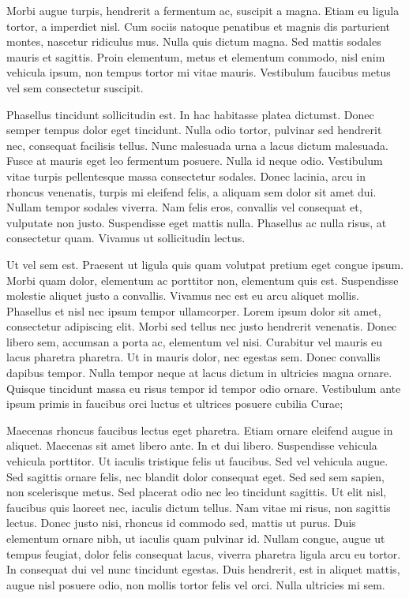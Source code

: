 \documentclass[11pt,a4paper]{report}
\begin{document}
Morbi augue turpis, hendrerit a fermentum ac, suscipit a magna. Etiam eu ligula tortor, a imperdiet nisl. Cum sociis natoque penatibus et magnis dis parturient montes, nascetur ridiculus mus. Nulla quis dictum magna. Sed mattis sodales mauris et sagittis. Proin elementum, metus et elementum commodo, nisl enim vehicula ipsum, non tempus tortor mi vitae mauris. Vestibulum faucibus metus vel sem consectetur suscipit.

Phasellus tincidunt sollicitudin est. In hac habitasse platea dictumst. Donec semper tempus dolor eget tincidunt. Nulla odio tortor, pulvinar sed hendrerit nec, consequat facilisis tellus. Nunc malesuada urna a lacus dictum malesuada. Fusce at mauris eget leo fermentum posuere. Nulla id neque odio. Vestibulum vitae turpis pellentesque massa consectetur sodales. Donec lacinia, arcu in rhoncus venenatis, turpis mi eleifend felis, a aliquam sem dolor sit amet dui. Nullam tempor sodales viverra. Nam felis eros, convallis vel consequat et, vulputate non justo. Suspendisse eget mattis nulla. Phasellus ac nulla risus, at consectetur quam. Vivamus ut sollicitudin lectus.

Ut vel sem est. Praesent ut ligula quis quam volutpat pretium eget congue ipsum. Morbi quam dolor, elementum ac porttitor non, elementum quis est. Suspendisse molestie aliquet justo a convallis. Vivamus nec est eu arcu aliquet mollis. Phasellus et nisl nec ipsum tempor ullamcorper. Lorem ipsum dolor sit amet, consectetur adipiscing elit. Morbi sed tellus nec justo hendrerit venenatis. Donec libero sem, accumsan a porta ac, elementum vel nisi. Curabitur vel mauris eu lacus pharetra pharetra. Ut in mauris dolor, nec egestas sem. Donec convallis dapibus tempor. Nulla tempor neque at lacus dictum in ultricies magna ornare. Quisque tincidunt massa eu risus tempor id tempor odio ornare. Vestibulum ante ipsum primis in faucibus orci luctus et ultrices posuere cubilia Curae;

Maecenas rhoncus faucibus lectus eget pharetra. Etiam ornare eleifend augue in aliquet. Maecenas sit amet libero ante. In et dui libero. Suspendisse vehicula vehicula porttitor. Ut iaculis tristique felis ut faucibus. Sed vel vehicula augue. Sed sagittis ornare felis, nec blandit dolor consequat eget. Sed sed sem sapien, non scelerisque metus. Sed placerat odio nec leo tincidunt sagittis. Ut elit nisl, faucibus quis laoreet nec, iaculis dictum tellus. Nam vitae mi risus, non sagittis lectus. Donec justo nisi, rhoncus id commodo sed, mattis ut purus. Duis elementum ornare nibh, ut iaculis quam pulvinar id. Nullam congue, augue ut tempus feugiat, dolor felis consequat lacus, viverra pharetra ligula arcu eu tortor. In consequat dui vel nunc tincidunt egestas. Duis hendrerit, est in aliquet mattis, augue nisl posuere odio, non mollis tortor felis vel orci. Nulla ultricies mi sem.
\end{document}

